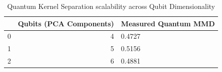 \begin{table}
\caption{Quantum Kernel Separation scalability across Qubit Dimensionality}
\label{tab:qubit_ablation}
\begin{tabular}{lrl}
\toprule
 & Qubits (PCA Components) & Measured Quantum MMD \\
\midrule
0 & 4 & 0.4727 \\
1 & 5 & 0.5156 \\
2 & 6 & 0.4881 \\
\bottomrule
\end{tabular}
\end{table}
